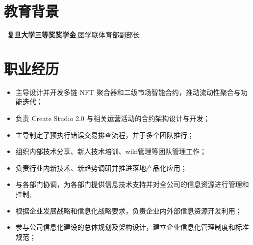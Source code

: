 \documentclass{resume}
\begin{document}



\section{教育背景}
\ \textbf{复旦大学三等奖奖学金},团学联体育部副部长

\section{职业经历}

\begin{itemize}[parsep=0.5ex]
  \item 主导设计并开发多链 NFT 聚合器和二级市场智能合约，推动流动性聚合与功能迭代；
  \item 负责 Create Studio 2.0 与相关运营活动的合约架构设计与开发；
  \item 主导制定了预执行错误交易排查流程，并于多个团队推行；
  \item 组织内部技术分享、新人技术培训、wiki管理等团队管理工作；
  \item 负责行业内新技术、新趋势调研并推进落地产品化应用；
\end{itemize}

\begin{itemize}[parsep=0.5ex]
  \item 与各部门协调，为各部门提供信息技术支持并对全公司的信息资源进行管理和控制;
  \item 根据企业发展战略和信息化战略要求，负责企业内外部信息资源开发利用；
  \item 参与公司信息化建设的总体规划及架构设计，建立企业信息化管理制度和标准规范；
\end{itemize}
\end{document}
